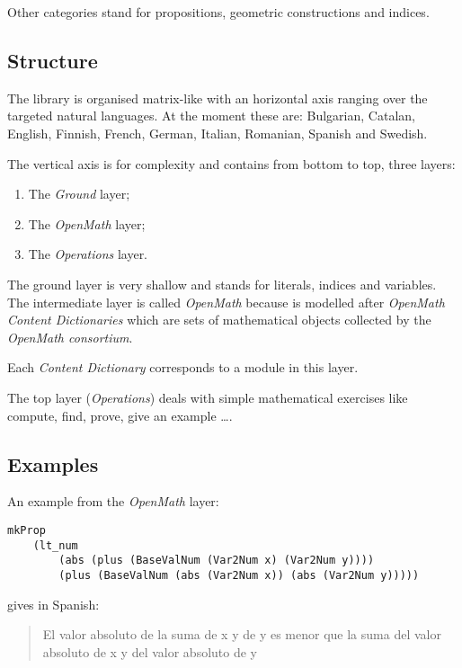 \documentclass[adraft,copyright,creativecommons]{eptcs}
\begin{document}
Other categories stand for propositions, geometric constructions and indices.

\subsection{Structure} %
\label{sub:structure}

The library is organised matrix-like with an horizontal axis ranging over the targeted natural languages.
At the moment these are: Bulgarian, Catalan, English, Finnish, French, German, Italian, Romanian, Spanish and Swedish.

The vertical axis is for complexity and contains from bottom to top, three layers:

\begin{enumerate}
	\item The \emph{Ground} layer;
	\item The \emph{OpenMath} layer;
	\item The \emph{Operations} layer.
\end{enumerate}

The ground layer is very shallow and stands for literals, indices and variables.
The intermediate layer is called \emph{OpenMath} because is modelled after \emph{OpenMath Content Dictionaries} which are sets of mathematical objects collected by the \emph{OpenMath consortium\cite{OpenMath}}.

Each \emph{Content Dictionary} corresponds to a module in this layer.

The top layer (\emph{Operations}) deals with simple mathematical exercises like compute, find, prove, give an example \ldots.


\subsection{Examples} %
\label{sub:examples}

An example from the \emph{OpenMath} layer:


\begin{lstlisting}
mkProp
	(lt_num
		(abs (plus (BaseValNum (Var2Num x) (Var2Num y))))
		(plus (BaseValNum (abs (Var2Num x)) (abs (Var2Num y)))))
\end{lstlisting}
gives in Spanish:
\begin{quote}
El valor absoluto de la suma  de x y de y es menor que la suma del valor absoluto  de x y del valor absoluto de y
\end{quote}
\end{document}
